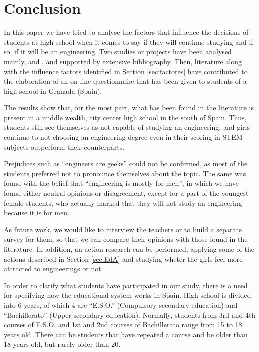 \documentclass[journal,transmag]{IEEEtran}
\begin{document}
\section{Conclusion}
\label{sec:conclusions}

In this paper we have tried to analyse the factors that influence the decisions of students at high school when it comes to say if they will continue studying and if so, if it will be an engineering. Two studies or projects have been analysed mainly, \cite{everis2012} and \cite{mtg2015}, and supported by extensive bibliography. Then, literature along with the influence factors identified in Section \ref{sec:factores} have contributed to the elaboration of an on-line questionnaire that has been given to students of a high school in Granada (Spain).

The results show that, for the most part, what has been found in the literature is present in a middle wealth, city center high school in the south of Spain. Thus, students still see themselves as not capable of studying an engineering, and girls continue to not choosing an engineering degree even in their scoring in STEM subjects outperform their counterparts.

Prejudices such as ``engineers are geeks'' could not be confirmed, as most of the students preferred not to pronounce themselves about the topic. The same was found with the belief that ``engineering is mostly for men'', in which we have found either neutral opinions or disagreement, except for a part of the youngest female students, who actually marked that they will not study an engineering because it is for men.

As future work, we would like to interview the teachers or to build a separate survey for them, so that we can compare their opinions with those found in the literature. In addition, an action-research can be performed, applying some of the actions described in Section \ref{sec:EdA} and studying wheter the girls feel more attracted to engineerings or not.

\label{ap:courses}

In order to clarify what students have participated in our study, there is a need for specifying how the educational system works in Spain. High school is divided into 6 years, of which 4 are ``E.S.O.'' (Compulsory secondary education) and ``Bachillerato'' (Upper secondary education). Normally, students from 3rd and 4th courses of E.S.O. and 1st and 2nd courses of Bachillerato range from 15 to 18 years old. There can be students that have repeated a course and be older than 18 years old, but rarely older than 20.
\end{document}
